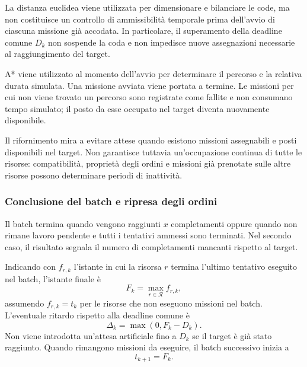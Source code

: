 \begin{nota}
	La distanza euclidea viene utilizzata per dimensionare
	e bilanciare le code, ma non costituisce un controllo
	di ammissibilità temporale prima dell'avvio
	di ciascuna missione già accodata.
	In particolare, il superamento della deadline comune
	$D_k$ non sospende la coda e non impedisce nuove
	assegnazioni necessarie al raggiungimento del target.
\end{nota}

\noindent A* viene utilizzato al momento dell'avvio per
determinare il percorso e la relativa durata simulata.
Una missione avviata viene portata a termine.
Le missioni per cui non viene trovato un percorso
sono registrate come fallite e non consumano tempo
simulato; il posto da esse occupato nel target
diventa nuovamente disponibile.

Il rifornimento mira a evitare attese quando esistono
missioni assegnabili e posti disponibili nel target.
Non garantisce tuttavia un'occupazione continua
di tutte le risorse: compatibilità, proprietà
degli ordini e missioni già prenotate sulle altre
risorse possono determinare periodi di inattività.

\subsubsection{Conclusione del batch e ripresa degli ordini}

Il batch termina quando vengono raggiunti $x$
completamenti oppure quando non rimane lavoro pendente
e tutti i tentativi ammessi sono terminati.
Nel secondo caso, il risultato segnala il numero
di completamenti mancanti rispetto al target.

Indicando con $f_{r,k}$ l'istante in cui la risorsa $r$
termina l'ultimo tentativo eseguito nel batch,
l'istante finale è
\begin{equation}
	F_k=\max_{r\in\mathcal{R}}f_{r,k},
\end{equation}
assumendo $f_{r,k}=t_k$ per le risorse che non eseguono
missioni nel batch. L'eventuale ritardo rispetto alla deadline comune è
\begin{equation}
	\Delta_k=\max(0,F_k-D_k).
\end{equation}
Non viene introdotta un'attesa artificiale fino a $D_k$
se il target è già stato raggiunto.
Quando rimangono missioni da eseguire, il batch
successivo inizia a
\begin{equation}
	t_{k+1}=F_k.
\end{equation}

